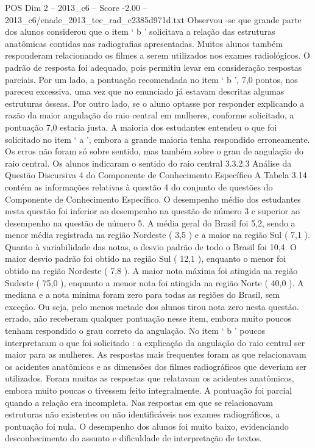 \begin{textsample}{POS Dim 2 – 2013\_c6 – Score -2.00 – 2013\_c6/enade\_2013\_tec\_rad\_c2385d971d.txt}
Observou -se que grande parte dos alunos considerou que o item ‘ b ’ solicitava a relação das estruturas anatômicas contidas nas radiografias apresentadas.
Muitos alunos também responderam relacionando os filmes a serem utilizados nos exames radiológicos.
O padrão de resposta foi adequado, pois permitiu levar em consideração respostas parciais.
Por um lado, a pontuação recomendada no item ‘ b ’, 7,0 pontos, nos pareceu excessiva, uma vez que no enunciado já estavam descritas algumas estruturas ósseas.
Por outro lado, se o aluno optasse por responder explicando a razão da maior angulação do raio central em mulheres, conforme solicitado, a pontuação 7,0 estaria justa.
A maioria dos estudantes entendeu o que foi solicitado no item ‘ a ’, embora a grande maioria tenha respondido erroneamente.
Os erros não foram só sobre sentido, mas também sobre o grau de angulação do raio central.
Os alunos indicaram o sentido do raio central 3.3.2.3 Análise da Questão Discursiva 4 do Componente de Conhecimento Específico A Tabela 3.14 contém as informações relativas à questão 4 do conjunto de questões do Componente de Conhecimento Específico.
O desempenho médio dos estudantes nesta questão foi inferior ao desempenho na questão de número 3 e superior ao desempenho na questão de número 5.
A média geral do Brasil foi 5,2, sendo a menor média registrada na região Nordeste ( 3,5 ) e a maior na região Sul ( 7,1 ).
Quanto à variabilidade das notas, o desvio padrão de todo o Brasil foi 10,4.
O maior desvio padrão foi obtido na região Sul ( 12,1 ), enquanto o menor foi obtido na região Nordeste ( 7,8 ).
A maior nota máxima foi atingida na região Sudeste ( 75,0 ), enquanto a menor nota foi atingida na região Norte ( 40,0 ).
A mediana e a nota mínima foram zero para todas as regiões do Brasil, sem exceção.
Ou seja, pelo menos metade dos alunos tirou nota zero nesta questão. errado, não receberam qualquer pontuação nesse item, embora muito poucos tenham respondido o grau correto da angulação.
No item ‘ b ’ poucos interpretaram o que foi solicitado : a explicação da angulação do raio central ser maior para as mulheres.
As respostas mais frequentes foram as que relacionavam os acidentes anatômicos e as dimensões dos filmes radiográficos que deveriam ser utilizados.
Foram muitas as respostas que relatavam os acidentes anatômicos, embora muito poucas o tivessem feito integralmente.
A pontuação foi parcial quando a relação era incompleta.
Nas respostas em que se relacionavam estruturas não existentes ou não identificáveis nos exames radiográficos, a pontuação foi nula.
O desempenho dos alunos foi muito baixo, evidenciando desconhecimento do assunto e dificuldade de interpretação de textos.

\end{textsample}
